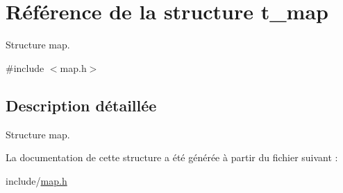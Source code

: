 \hypertarget{structt__map}{}\section{Référence de la structure t\+\_\+map}
\label{structt__map}


Structure map.  




{\ttfamily \#include $<$map.\+h$>$}



\subsection{Description détaillée}
Structure map. 

La documentation de cette structure a été générée à partir du fichier suivant \+:\begin{DoxyCompactItemize}
\item 
include/\hyperlink{map_8h}{map.\+h}\end{DoxyCompactItemize}
